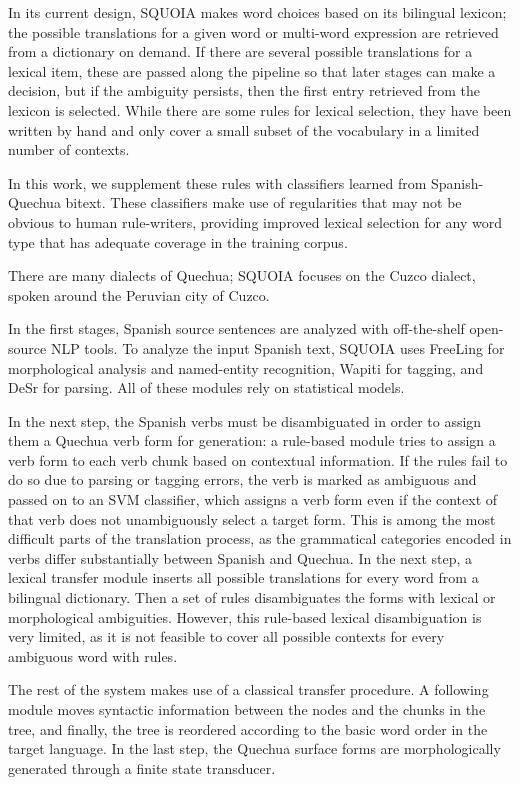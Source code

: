 In its current design, SQUOIA makes word choices based on its bilingual
lexicon; the possible translations for a given word or multi-word expression
are retrieved from a dictionary on demand. If there are several possible
translations for a lexical item, these are passed along the pipeline so
that later stages can make a decision, but if the ambiguity persists,
then the first entry retrieved from the lexicon is selected. While there are
some rules for lexical selection, they have been written by hand and only cover
a small subset of the vocabulary in a limited number of contexts.

In this work, we supplement these rules with classifiers learned from
Spanish-Quechua bitext.
These classifiers make use of regularities that may not
be obvious to human rule-writers, providing improved lexical selection for
any word type that has adequate coverage in the training corpus.

There are many dialects of Quechua; SQUOIA focuses on the
Cuzco dialect, spoken around the Peruvian city of Cuzco.

In the first stages, Spanish source sentences are analyzed with off-the-shelf
open-source NLP tools. To analyze the input Spanish text,
SQUOIA uses FreeLing \cite{padro12} for morphological analysis and named-entity
recognition,
Wapiti \cite{lavergne2010practical} for tagging,
and DeSr \cite{attardi-EtAl:2007:EMNLP-CoNLL2007} for parsing.
All of these modules rely on statistical models.

In the next step, the Spanish verbs must be disambiguated in order to assign
them a Quechua verb form for generation: a rule-based module tries to assign a
verb form to each verb chunk based on contextual information. If the rules fail to
do so due to parsing or tagging errors, the verb is marked as ambiguous and
passed on to an SVM classifier, which assigns a verb form even if the context
of that verb does not unambiguously select a target form. This is among the
most difficult parts of the
translation process, as the grammatical categories encoded in verbs differ
substantially between Spanish and Quechua. In the next step, a lexical transfer
module inserts all possible translations for every word from a bilingual dictionary.
Then a set of rules disambiguates the forms with lexical or morphological
ambiguities. However, this rule-based lexical disambiguation is very limited,
as it is not feasible to cover all possible contexts for every ambiguous word
with rules.

The rest of the system makes use of a classical transfer procedure. A following module
moves syntactic information between the nodes and the chunks in the tree, and
finally, the tree is reordered according to the basic word order in the target
language. In the last step, the Quechua surface forms are morphologically
generated through a finite state transducer.

